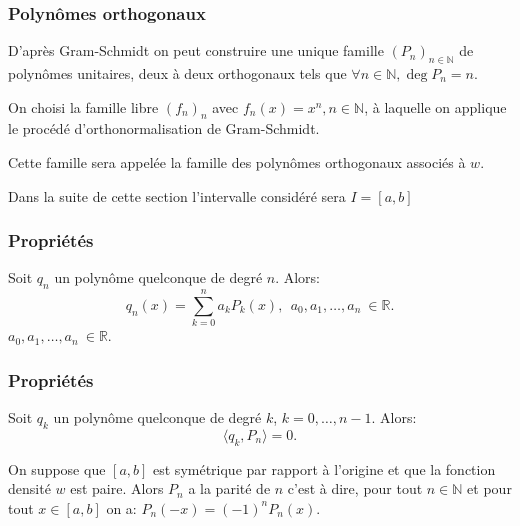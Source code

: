 \documentclass[xcolor=dvipsnames,10pt,mathserif]{beamer}
\theoremstyle{plain}
\newcommand{\la}{\langle}
\newcommand{\ra}{\rangle}
\newcommand{\R}{\mathbb{R}}
\newcommand{\N}{\mathbb{N}}
\begin{document}
\begin{frame} \frametitle{Polynômes orthogonaux \hfill \insertpagenumber}

\begin{block}{}

D'après Gram-Schmidt on peut construire une unique famille $ (P_n)_{n \in \N }$ de polynômes unitaires, deux à deux orthogonaux tels que $ \forall n \in \N, \deg{P_n} = n $.
\end{block}

\pause

\begin{block}{}
On choisi la famille libre $(f_n)_n$ avec $f_n(x)=x^n, n \in \N$, à laquelle on applique le procédé d'orthonormalisation de Gram-Schmidt. 

Cette famille sera appelée la famille des polynômes orthogonaux associés à $w$.

\end{block}

Dans la suite de cette section l'intervalle considéré sera $I=[a,b]$

\end{frame}
\begin{frame} \frametitle{Propriétés \hfill \insertpagenumber}

\begin{block}{}
Soit $q_n$ un polynôme quelconque de degré $n$. Alors: 
\begin{equation}
q_n(x)=\sum\limits_{k=0}^n a_k P_k(x),\ \ a_0,a_1,\dots,a_n \ \in \R.
\end{equation}
$a_0,a_1,\dots,a_n\ \in \R$. 
\end{block}

\end{frame}
\begin{frame} \frametitle{Propriétés \hfill \insertpagenumber}

\begin{block}{}
Soit  $ q_k $ un polynôme quelconque de degré $k$, $k=0,\dots,n-1$. Alors: $$ \la q_k,P_n \ra = 0.$$
\end{block}

\pause

\begin{block}{}
On suppose que $[a,b]$ est symétrique par rapport à l'origine et que la fonction densité $w$ est paire. Alors $P_n$ a la parité de $n$ c'est à dire, pour tout $ n \in \N $ et pour tout $ x \in [a,b]$ on a: $P_n(-x)=(-1)^n P_n(x)$.
\end{block}

\end{frame}
\end{document}
